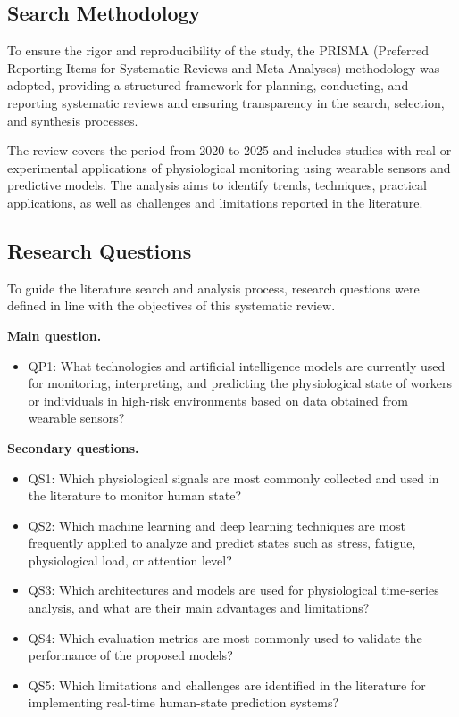 \documentclass[runningheads]{llncs}
\begin{document}
\subsection{Search Methodology}
To ensure the rigor and reproducibility of the study, the PRISMA (Preferred Reporting Items for Systematic Reviews and Meta-Analyses) methodology was adopted, providing a structured framework for planning, conducting, and reporting systematic reviews and ensuring transparency in the search, selection, and synthesis processes.

The review covers the period from 2020 to 2025 and includes studies with real or experimental applications of physiological monitoring using wearable sensors and predictive models. The analysis aims to identify trends, techniques, practical applications, as well as challenges and limitations reported in the literature.

\subsection{Research Questions}

To guide the literature search and analysis process, research questions were defined in line with the objectives of this systematic review.

\textbf{Main question.}

\begin{itemize}
    \item QP1: What technologies and artificial intelligence models are currently used for monitoring, interpreting, and predicting the physiological state of workers or individuals in high-risk environments based on data obtained from wearable sensors?
\end{itemize}

\textbf{Secondary questions.}

\begin{itemize}
    \item QS1: Which physiological signals are most commonly collected and used in the literature to monitor human state?
    \item QS2: Which machine learning and deep learning techniques are most frequently applied to analyze and predict states such as stress, fatigue, physiological load, or attention level?
    \item QS3: Which architectures and models are used for physiological time-series analysis, and what are their main advantages and limitations?
    \item QS4: Which evaluation metrics are most commonly used to validate the performance of the proposed models?
    \item QS5: Which limitations and challenges are identified in the literature for implementing real-time human-state prediction systems?
\end{itemize}
\end{document}
